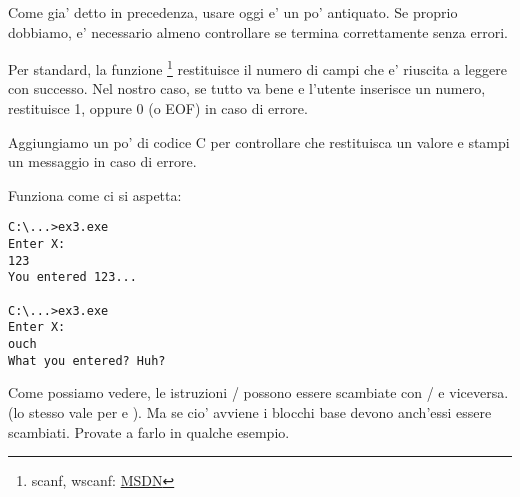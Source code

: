 
Come gia' detto in precedenza, usare \scanf oggi e' un po' antiquato.
Se proprio dobbiamo, e' necessario almeno controllare se \scanf termina correttamente senza errori.



Per standard, la funzione \scanf\footnote{scanf, wscanf: \href{http://go.yurichev.com/17255}{MSDN}} restituisce il numero di campi che e' riuscita a leggere con successo.
Nel nostro caso, se tutto va bene e l'utente inserisce un numero, \scanf restituisce 1, oppure 0 (o \ac{EOF}) in caso di errore. 

Aggiungiamo un po' di codice C per controllare che \scanf restituisca un valore e stampi un messaggio in caso di errore.

Funziona come ci si aspetta:

\begin{lstlisting}
C:\...>ex3.exe
Enter X:
123
You entered 123...

C:\...>ex3.exe
Enter X:
ouch
What you entered? Huh?
\end{lstlisting}






\subsectionold{\Exercise}

Come possiamo vedere, le istruzioni / possono essere scambiate con / e viceversa.
(lo stesso vale per  e ).
Ma se cio' avviene i blocchi base devono anch'essi essere scambiati. Provate a farlo in qualche esempio.

